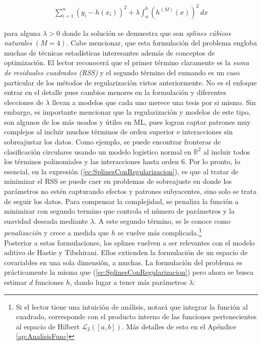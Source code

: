 \documentclass[../Main/Main.tex]{subfiles}
\begin{document}
\begin{align}
	\sum_{i=1}^n(y_i - h(x_i))^2 + \lambda\int_a^b (h^{(M)}(x))^2 \, dx \label{ec:SplinesConRegularizacion}
\end{align}

para alguna $\lambda > 0$ donde la solución se demuestra que son \textit{splines cúbicos naturales} $(M = 4)$. Cabe mencionar, que esta formulación del problema engloba muchas de técnicas estadísticas interesantes además de conceptos de optimización. El lector reconocerá que el primer término claramente es la \textit{suma de residuales cuadrados (RSS)} y el segundo término del sumando es un caso particular de los métodos de regularización vistos anteriormente. No es el enfoque entrar en el detalle pues cambios menores en la formulación y diferentes elecciones de $\lambda$ llevan a modelos que cada uno merece una tesis por si mismo. Sin embargo, es importante mencionar que la regularización y modelos de este tipo, son algunos de los más usados y útiles en ML, pues logran captar patrones muy complejos al incluir muchos términos de orden superior e interacciones sin sobreajustar los datos. Como ejemplo, se puede encontrar fronteras de clasificación circulares usando un modelo logistico normal en $\mathbb{R}^2$ al incluir todos los términos polinomiales y las interacciones hasta orden 6. Por lo pronto, lo esencial, en la expresión (\ref{ec:SplinesConRegularizacion}), es que al tratar de minimizar el RSS se puede caer en problemas de sobreajuste en donde los parámetros no estén capturando efectos y patrones subyacentes, sino solo se trata de seguir los datos. Para compensar la complejidad, se penaliza la función a minimizar con segundo termino que controla el número de parámetros y la suavidad deseada mediante $\lambda$. A este segundo término, se le conoce como \textit{penalización} y crece a medida que $h$ se vuelve más complicada.\footnote{Si el lector tiene una intuición de análisis, notará que integrar la función al cuadrado, corresponde con el producto interno de las funciones pertenecientes al espacio de Hilbert $\mathcal{L}_2([a,b])$. Más detalles de esto en el  Apéndice \ref{ap:AnalisisFunc}}\\

Posterior a estas formulaciones, los splines vuelven a ser relevantes con el modelo aditivo de Hastie y Tibshirani. Ellos extienden la formulación de un espacio de covariables en una sola dimensión, a muchas. La formulación del problema es prácticamente la misma que  (\ref{ec:SplinesConRegularizacion}) pero ahora se busca estimar $d$ funciones $h$, dando lugar a tener más parámetros $\lambda$:
\end{document}

